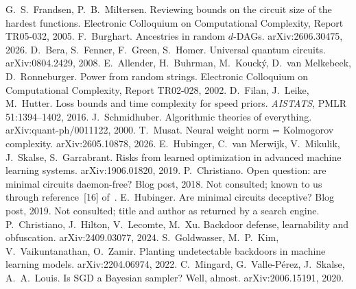  G.~S.~Frandsen, P.~B.~Miltersen. Reviewing bounds on the circuit size of the hardest
functions. Electronic Colloquium on Computational Complexity, Report TR05-032, 2005.
 F.~Burghart. Ancestries in random $d$-DAGs. arXiv:2606.30475, 2026.
 D.~Bera, S.~Fenner, F.~Green, S.~Homer. Universal quantum circuits. arXiv:0804.2429, 2008.
 E.~Allender, H.~Buhrman, M.~Kouck\'y, D.~van Melkebeek, D.~Ronneburger. Power from random
strings. Electronic Colloquium on Computational Complexity, Report TR02-028, 2002.
 D.~Filan, J.~Leike, M.~Hutter. Loss bounds and time complexity for speed priors.
\emph{AISTATS}, PMLR 51:1394--1402, 2016.
 J.~Schmidhuber. Algorithmic theories of everything. arXiv:quant-ph/0011122, 2000.
 T.~Musat. Neural weight norm = Kolmogorov complexity. arXiv:2605.10878, 2026.
 E.~Hubinger, C.~van Merwijk, V.~Mikulik, J.~Skalse, S.~Garrabrant. Risks from learned
optimization in advanced machine learning systems. arXiv:1906.01820, 2019.
 P.~Christiano. Open question: are minimal circuits daemon-free? Blog post, 2018. Not
consulted; known to us through reference~[16] of~\cite{hubinger19}.
 E.~Hubinger. Are minimal circuits deceptive? Blog post, 2019. Not consulted; title and
author as returned by a search engine.
 P.~Christiano, J.~Hilton, V.~Lecomte, M.~Xu. Backdoor defense, learnability and
obfuscation. arXiv:2409.03077, 2024.
 S.~Goldwasser, M.~P.~Kim, V.~Vaikuntanathan, O.~Zamir. Planting undetectable backdoors
in machine learning models. arXiv:2204.06974, 2022.
 C.~Mingard, G.~Valle-P\'erez, J.~Skalse, A.~A.~Louis. Is SGD a Bayesian sampler? Well,
almost. arXiv:2006.15191, 2020.

